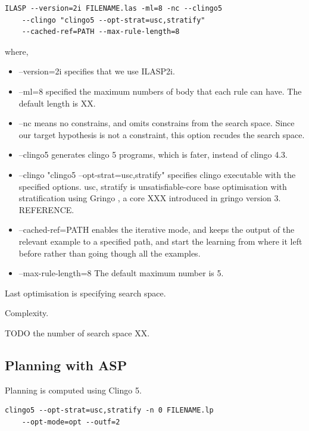 
\begin{lstlisting}[]
    ILASP --version=2i FILENAME.las -ml=8 -nc --clingo5 
    --clingo "clingo5 --opt-strat=usc,stratify" 
    --cached-ref=PATH --max-rule-length=8
\end{lstlisting}

where,
\begin{itemize}
\item \textsf{--version=2i} specifies that we use ILASP2i.
\item \textsf{--ml=8} specified the maximum numbers of body that each rule can have. The default length is XX.
\item \textsf{--nc} means no constrains, and omits constrains from the search space. Since our target hypothesis is not a constraint, this option recudes the search space.
\item \textsf{--clingo5} generates clingo 5 programs, which is fater, instead of clingo 4.3.
\item \textsf{--clingo "clingo5 --opt-strat=usc,stratify"} specifies clingo executable with the specified options. 
\textsf{usc, stratify} is unsatisfiable-core base optimisation with stratification using Gringo \cite{gringo}, a core XXX introduced in gringo version 3. REFERENCE.
\item \textsf{--cached-ref=PATH} enables the iterative mode, and keeps the output of the relevant example to a specified path, and start the learning from where it left before rather than going though all the examples.
\item \textsf{--max-rule-length=8} The default maximum number is 5.
\end{itemize}

Last optimisation is specifying search space.

Complexity. 

TODO the number of search space XX. 

\subsection{Planning with ASP}
Planning is computed using Clingo 5.

\begin{lstlisting}[]
    clingo5 --opt-strat=usc,stratify -n 0 FILENAME.lp
    --opt-mode=opt --outf=2
\end{lstlisting}

